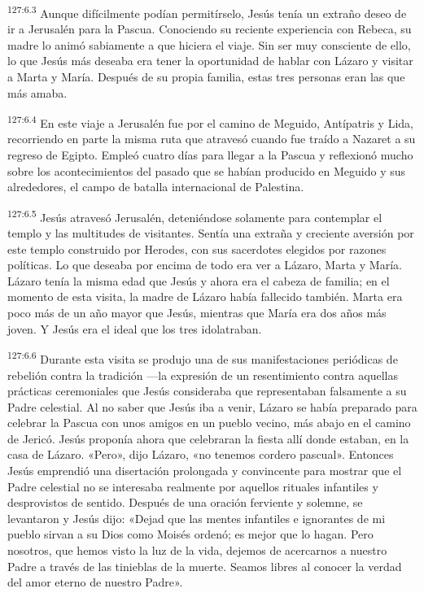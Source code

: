 \par
\textsuperscript{127:6.3} Aunque difícilmente podían permitírselo, Jesús tenía un extraño deseo de ir a Jerusalén para la Pascua. Conociendo su reciente experiencia con Rebeca, su madre lo animó sabiamente a que hiciera el viaje. Sin ser muy consciente de ello, lo que Jesús más deseaba era tener la oportunidad de hablar con Lázaro y visitar a Marta y María. Después de su propia familia, estas tres personas eran las que más amaba.

\par
\textsuperscript{127:6.4} En este viaje a Jerusalén fue por el camino de Meguido, Antípatris y Lida, recorriendo en parte la misma ruta que atravesó cuando fue traído a Nazaret a su regreso de Egipto. Empleó cuatro días para llegar a la Pascua y reflexionó mucho sobre los acontecimientos del pasado que se habían producido en Meguido y sus alrededores, el campo de batalla internacional de Palestina.

\par
\textsuperscript{127:6.5} Jesús atravesó Jerusalén, deteniéndose solamente para contemplar el templo y las multitudes de visitantes. Sentía una extraña y creciente aversión por este templo construido por Herodes, con sus sacerdotes elegidos por razones políticas. Lo que deseaba por encima de todo era ver a Lázaro, Marta y María. Lázaro tenía la misma edad que Jesús y ahora era el cabeza de familia; en el momento de esta visita, la madre de Lázaro había fallecido también. Marta era poco más de un año mayor que Jesús, mientras que María era dos años más joven. Y Jesús era el ideal que los tres idolatraban.

\par
\textsuperscript{127:6.6} Durante esta visita se produjo una de sus manifestaciones periódicas de rebelión contra la tradición ---la expresión de un resentimiento contra aquellas prácticas ceremoniales que Jesús consideraba que representaban falsamente a su Padre celestial. Al no saber que Jesús iba a venir, Lázaro se había preparado para celebrar la Pascua con unos amigos en un pueblo vecino, más abajo en el camino de Jericó. Jesús proponía ahora que celebraran la fiesta allí donde estaban, en la casa de Lázaro. «Pero», dijo Lázaro, «no tenemos cordero pascual». Entonces Jesús emprendió una disertación prolongada y convincente para mostrar que el Padre celestial no se interesaba realmente por aquellos rituales infantiles y desprovistos de sentido. Después de una oración ferviente y solemne, se levantaron y Jesús dijo: «Dejad que las mentes infantiles e ignorantes de mi pueblo sirvan a su Dios como Moisés ordenó; es mejor que lo hagan. Pero nosotros, que hemos visto la luz de la vida, dejemos de acercarnos a nuestro Padre a través de las tinieblas de la muerte. Seamos libres al conocer la verdad del amor eterno de nuestro Padre».


